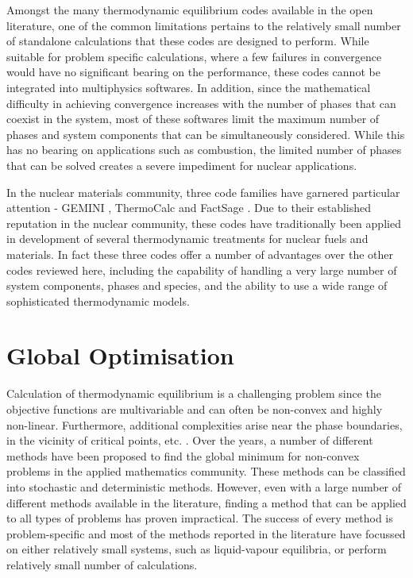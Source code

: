 	Amongst the many thermodynamic equilibrium codes available in the open literature, one of the common limitations pertains to the relatively small number of standalone calculations that these codes are designed to perform. While suitable for problem specific calculations, where a few failures in convergence would have no significant bearing on the performance, these codes cannot be integrated into multiphysics softwares. In addition, since the mathematical difficulty in achieving convergence increases with the number of phases that can coexist in the system, most of these softwares  limit the maximum number of phases and system components that can be simultaneously considered. While this has no bearing on applications such as combustion, the limited number of phases that can be solved creates a severe impediment for nuclear applications. 

	In the nuclear materials community, three code families have garnered particular attention - GEMINI \cite{Cheynet09}, ThermoCalc \cite{ANDERSSON2002273} and FactSage \cite{Bale02}. Due to their established reputation in the nuclear community, these codes have traditionally been applied in development of several thermodynamic treatments for nuclear fuels and materials. In fact these three codes offer a number of advantages over the other codes reviewed here, including the capability of handling a very large number of system components, phases and species, and the ability to use a wide range of sophisticated thermodynamic models.
	
	\section{Global Optimisation}
	Calculation of thermodynamic equilibrium is a challenging problem since the objective functions are multivariable and can often be non-convex and highly non-linear. Furthermore, additional complexities arise near the phase boundaries, in the vicinity of critical points, etc. \cite{Wakeham04,TEH2002745}. Over the years, a number of different methods have been proposed to find the global minimum for non-convex problems in the applied mathematics community. These methods can be classified into stochastic and deterministic methods. However, even with a large number of different methods available in the literature, finding a method that can be applied to all types of problems has proven impractical. The success of every method is problem-specific and most of the methods reported in the literature have focussed on either relatively small systems, such as liquid-vapour equilibria, or perform relatively small number of calculations.
	
